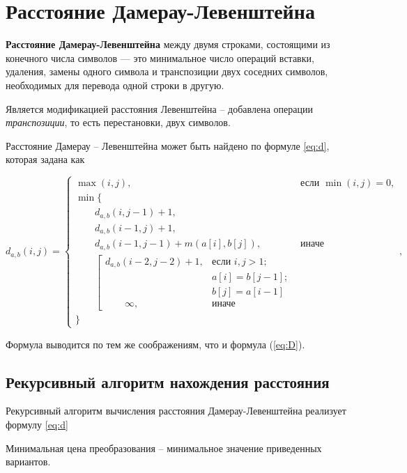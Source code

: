 \section{Расстояние Дамерау-Левенштейна}

\textbf{Расстояние Дамерау-Левенштейна} \cite{damerau-levenshtein} между двумя строками, состоящими из конечного числа символов — это минимальное число операций вставки, удаления, замены одного символа и транспозиции двух соседних символов, необходимых для перевода одной строки в другую.

Является модификацией расстояния Левенштейна -- добавлена операции \textit{транспозиции}, то есть перестановки, двух символов.

Расстояние Дамерау -- Левенштейна может быть найдено по формуле \ref{eq:d}, которая задана как


\begin{equation}
	\label{eq:d}
	d_{a,b}(i, j) = \begin{cases}
		\max(i, j), &\text{если }\min(i, j) = 0,\\
		\min \lbrace \\
			\qquad d_{a,b}(i, j-1) + 1,\\
			\qquad d_{a,b}(i-1, j) + 1,\\
			\qquad d_{a,b}(i-1, j-1) + m(a[i], b[j]), &\text{иначе}\\
			\qquad \left[ \begin{array}{cc}d_{a,b}(i-2, j-2) + 1, &\text{если }i,j > 1;\\
			\qquad &\text{}a[i] = b[j-1]; \\
			\qquad &\text{}b[j] = a[i-1]\\
			\qquad \infty, & \text{иначе}\end{array}\right.\\
		\rbrace
		\end{cases},
\end{equation}

Формула выводится по тем же соображениям, что и формула (\ref{eq:D}).

\subsection{Рекурсивный алгоритм нахождения расстояния}
Рекурсивный алгоритм вычисления расстояния Дамерау-Левенштейна реализует формулу \ref{eq:d}

Минимальная цена преобразования -- минимальное значение приведенных вариантов.


